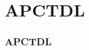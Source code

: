\documentclass[20pt]{beamer}
\begin{document}
\section{APCTDL}

\begin{frame}
\frametitle{APCTDL}
\begin{figure}[b]
    \centering
\end{figure} 
\end{frame}
\end{document}
